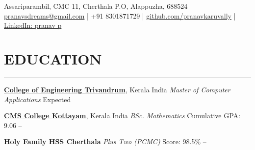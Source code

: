 \documentclass[letterpaper,MMMyyyy,nonstopmode]{simpleresumecv}
\begin{document}
    \begin{center}
        
        \begin{SubTitle}
        Assariparambil, CMC 11, Cherthala P.O, Alappuzha, 688524 \\
        \href{mailto:pranavsdreams@gmail.com} {pranavsdreams@gmail.com}
        | +91 8301871729
        | \href{https://github.com/pranavkaruvally} {\url{github.com/pranavkaruvally}} 
        | \href{https://www.linkedin.com/in/pranav-p-76b901183} {LinkedIn: pranav p}
        \end{SubTitle}
    \end{center}

    \section*{EDUCATION}
        \hrule
        \vspace{8pt}
        {\href{https://cet.ac.in}{\textbf{\large College of Engineering Trivandrum}},
        {\large Kerala India}  
        \newline\textit{\large Master of Computer Applications}}
        \hfill
        Expected 
        \vspace{5pt}

        {\href{https://cmscollege.ac.in}{\textbf{\large CMS College Kottayam}},
        {\large Kerala India}
        \newline\textit{\large BSc. Mathematics}
        \newline Cumulative GPA: 9.06}
        \hfill
         --
        \vspace{5pt}

        {\textbf{\large Holy Family HSS Cherthala}
        \newline\textit{\large Plus Two (PCMC)}
        \newline Score: 98.5\%}
        \hfill
         --
\end{document}
